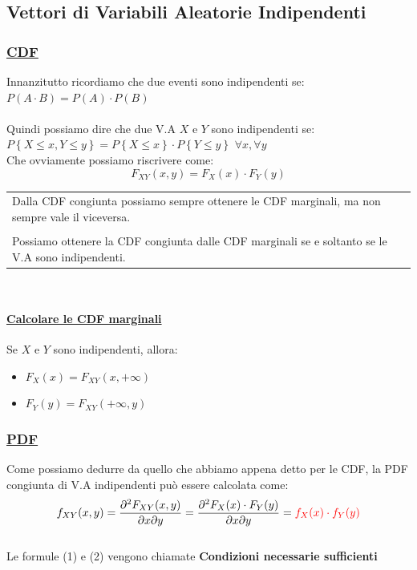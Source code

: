 \documentclass{article}
\begin{document}
\subsection{Vettori di Variabili Aleatorie Indipendenti}
\subsubsection{\underline{CDF}}
Innanzitutto ricordiamo che due eventi sono indipendenti se: $P(A \cdot B) = P(A) \cdot P(B)$ \\ \\
Quindi possiamo dire che due V.A $X$ e $Y$ sono indipendenti se: $P\left\{ X \leq x, Y \leq y \right\} = P\left\{X \leq x \right\} \cdot P\left\{Y \leq y \right\}$   $\forall x, \forall y$ \\
Che ovviamente possiamo riscrivere come: 
\begin{equation}
   F_{XY}(x,y) = F_X(x) \cdot F_Y(y) 
\end{equation}
\begin{tabular}{|p{13cm}}
Dalla CDF congiunta possiamo sempre ottenere le CDF marginali, ma non sempre vale il viceversa. \\ \\
Possiamo ottenere la CDF congiunta dalle CDF marginali se e soltanto se le V.A sono indipendenti. 
\end{tabular} \\
\paragraph{\underline{Calcolare le CDF marginali}}
Se $X$ e $Y$ sono indipendenti, allora: 
\begin{itemize}
    \item $F_X(x) = F_{XY}(x,+\infty)$
    \item $F_Y(y) = F_{XY}(+\infty,y)$
\end{itemize}
\subsubsection{\underline{PDF}}
Come possiamo dedurre da quello che abbiamo appena detto per le CDF, la PDF congiunta di V.A indipendenti può essere calcolata come: 
\begin{equation}
    f_{XY}(x,y) = \frac{\partial^2F_{XY}(x,y)}{\partial x \partial y} = \frac{\partial^2 F_X(x) \cdot F_Y(y)}{\partial x \partial y} = {\color{red}f_X(x) \cdot f_Y(y)}
\end{equation} ~\\
Le formule (1) e (2) vengono chiamate \textbf{Condizioni necessarie sufficienti}
\end{document}
